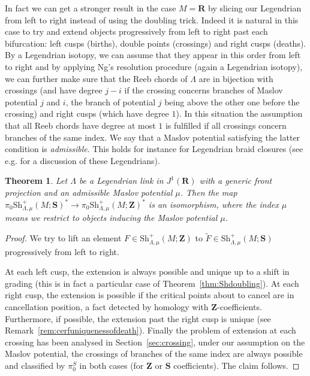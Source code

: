 \documentclass[12pt,a4paper]{article}
\numberwithin{equation}{section}
\newtheorem{thm}[equation]{Theorem}
\theoremstyle{definition}
\theoremstyle{remark}
\newcommand{\Z}{\mathbf{Z}}
\newcommand{\R}{\mathbf{R}}
\newcommand{\Sh}{\mathrm{Sh}}
\renewcommand{\S}{\mathbf{S}}
\begin{document}
In fact we can get a stronger result in the case $M=\R$ by slicing our Legendrian from left to right
instead of using the doubling trick. Indeed it is natural in this case to try and extend objects progressively from left to right past each bifurcation:
left cusps (births), double points (crossings) and right cusps (deaths).
By a Legendrian isotopy, we can assume that they appear in this order from left to right
and by applying Ng's resolution procedure (again a Legendrian isotopy), we can further make sure that the Reeb chords of $\Lambda$
are in bijection with crossings (and have degree $j-i$ if the crossing concerns branches of Maslov potential $j$ and $i$,
the branch of potential $j$ being above the other one before the crossing) and right cusps (which have degree $1$).
In this situation the assumption that all Reeb chords have degree at most $1$ is fulfilled if all crossings
concern branches of the same index. We say that a Maslov potential satisfying the latter condition is \emph{admissible}. This holds for instance for Legendrian braid closures (see e.g. \cite{Kalman} for a discussion of these Legendrians).
\begin{thm} \label{strong thm b}
Let $\Lambda$ be a Legendrian link in $J^1(\R)$ with a generic front projection and an admissible Maslov potential $\mu$.
Then the map $\pi_0\Sh_{\Lambda,\mu}^+(M;\S)^* \to \pi_0\Sh_{\Lambda,\mu}^+(M;\Z)^*$ is an isomorphism,
where the index $\mu$ means we restrict to objects inducing the Maslov potential $\mu$.
\end{thm}
\begin{proof}
We try to lift an element $F\in\Sh_{\Lambda,\mu}^+(M;\Z)$ to $\tilde{F}\in \Sh_{\Lambda,\mu}^+(M;\S)$ progressively
from left to right.

At each left cusp, the extension is always possible and unique up to a shift in grading (this is in fact a particular case
of Theorem~\ref{thm:Shdoubling}). At each right cusp, the extension is possible if the critical points about to cancel
are in cancellation position, a fact detected by homology with $\Z$-coefficients. Furthermore, if possible, the extension
past the right cusp is unique (see Remark~\ref{rem:cerfuniquenessofdeath}). Finally the problem of extension at each crossing has been analysed in Section~\ref{sec:crossing}, under our assumption on the Maslov potential, the crossings of branches of the same index
are always possible and classified by $\pi_0^S$ in both cases (for $\Z$ or $\S$ coefficients). The claim follows.
\end{proof}
\end{document}
